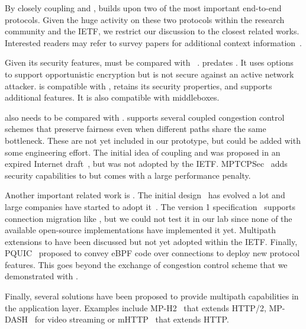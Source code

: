 
By closely coupling \tcp and \tls, \tcpls builds upon two of the most important
end-to-end protocols. Given the huge activity on these two protocols within the
research community and the IETF, we restrict our discussion to the closest
related works. Interested readers may refer to survey papers for additional context information~\cite{polese2019survey,li2016multipath,papastergiou2016ossifying}.

Given its security features, \tcpls must be compared with \tcpcrypt~\cite{bittau2010case,rfc8548}. \tcpcrypt predates . It uses \tcp options to support opportunistic encryption but is not secure against an active network attacker. \tcpls is compatible with \tls, retains its security properties, and supports additional features. It is also compatible with \tcp middleboxes.

\tcpls also needs to be compared with \mptcp \cite{raiciu2012hard,rfc6824}.
\mptcp supports several coupled congestion control schemes
\cite{peng2014multipath,wischik2011design,khalili2013mptcp} that preserve
fairness even when different paths share the same bottleneck. These are not yet
included in our \tcpls prototype, but could be added with some engineering
effort. The initial idea of coupling \mptcp and \tls was proposed in an expired
Internet draft~\cite{draft-paasch-mptcp-ssl-00}, but was not adopted by the
IETF. MPTCPSec~\cite{jadin2017securing} adds security capabilities to \mptcp but
comes with a large performance penalty.

Another important related work is \quic. The initial design~\cite{roskind2013quic} has evolved a lot and large companies have started to adopt it~\cite{langley2017quic,Joras_mvfst,marx2020same}. The \quic
version 1 specification~\cite{draft-ietf-quic-transport} supports connection
migration like \tcpls, but we could not test it in our lab since none of the
available open-source implementations have implemented it yet. Multipath
extensions
\cite{viernickel2018multipath,de2017multipath,draft-liu-multipath-quic-02}
to \quic have been discussed but not yet adopted within the IETF. Finally,
PQUIC~\cite{de2019pluginizing} proposed to convey eBPF code over \quic
connections to deploy new protocol features. This goes beyond the exchange of
congestion control scheme that we demonstrated with \tcpls.

Finally, several solutions have been proposed to provide multipath capabilities
in the application layer. Examples include MP-H2~\cite{nikravesh2019mp} that
extends HTTP/2, MP-DASH~\cite{han2016mp} for video streaming or mHTTP~\cite{kim2014multi} that extends HTTP.

